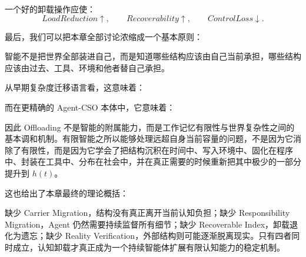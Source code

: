 一个好的卸载操作应使：
\begin{equation}
LoadReduction\uparrow,
\qquad
Recoverability\uparrow,
\qquad
ControlLoss\downarrow.
\end{equation}

最后，我们可以把本章全部讨论浓缩成一个基本原则：
\begin{statementbox}
智能不是把世界全部装进自己，而是知道哪些结构应该由自己当前承担，哪些结构应该由过去、工具、环境和他者替自己承担。
\end{statementbox}

从早期复杂度迁移语言看，这意味着：
\begin{statementbox}
\centering
{}
\end{statementbox}
而在更精确的 Agent-CSO 本体中，它意味着：
\begin{statementbox}
\centering
{}
\end{statementbox}

因此 Offloading 不是智能的附属能力，而是工作记忆有限性与世界复杂性之间的基本调和机制。有限智能之所以能够处理远超自身当前容量的问题，不是因为它消除了有限性，而是因为它学会了把结构沉积在时间中、写入环境中、固化在程序中、封装在工具中、分布在社会中，并在真正需要的时候重新把其中极少的一部分提升到 $h(t)$。

这也给出了本章最终的理论概括：

\begin{statementbox}
\centering
{}
\end{statementbox}

缺少 Carrier Migration，结构没有真正离开当前认知负担；缺少 Responsibility Migration，Agent 仍然需要持续监督所有细节；缺少 Recoverable Index，卸载退化为遗忘；缺少 Reality Verification，外部结构则可能逐渐脱离现实。只有四者同时成立，认知卸载才真正成为一个持续智能体扩展有限认知能力的稳定机制。
